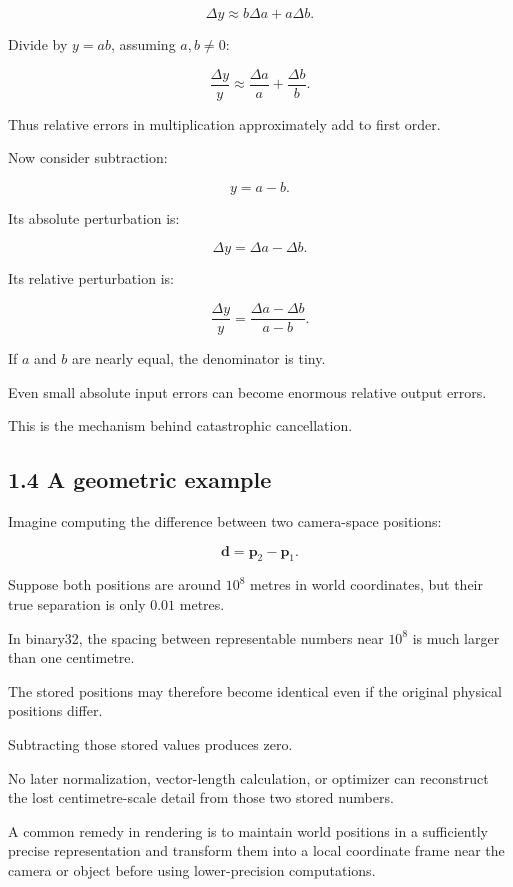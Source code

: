 \[ \Delta y\approx b\Delta a+a\Delta b. \]

Divide by \(y=ab\), assuming \(a,b\ne0\):

\[ \boxed{ \frac{\Delta y}{y} \approx \frac{\Delta a}{a}+ \frac{\Delta b}{b} }. \]

Thus relative errors in multiplication approximately add to first order.

Now consider subtraction:

\[ y=a-b. \]

Its absolute perturbation is:

\[ \Delta y=\Delta a-\Delta b. \]

Its relative perturbation is:

\[ \boxed{ \frac{\Delta y}{y} = \frac{\Delta a-\Delta b}{a-b} }. \]

If \(a\) and \(b\) are nearly equal, the denominator is tiny.

Even small absolute input errors can become enormous relative output errors.

This is the mechanism behind catastrophic cancellation.

\subsection{1.4 A geometric example}\label{02-foundations-ii-ch028-a-geometric-example}

\hypertarget{02-foundations-ii-ch028-a-geometric-example}{}

Imagine computing the difference between two camera-space positions:

\[ \mathbf d=\mathbf p_2-\mathbf p_1. \]

Suppose both positions are around \(10^8\) metres in world coordinates, but their true separation is only \(0.01\) metres.

In binary32, the spacing between representable numbers near \(10^8\) is much larger than one centimetre.

The stored positions may therefore become identical even if the original physical positions differ.

Subtracting those stored values produces zero.

No later normalization, vector-length calculation, or optimizer can reconstruct the lost centimetre-scale detail from those two stored numbers.

A common remedy in rendering is to maintain world positions in a sufficiently precise representation and transform them into a local coordinate frame near the camera or object before using lower-precision computations.

